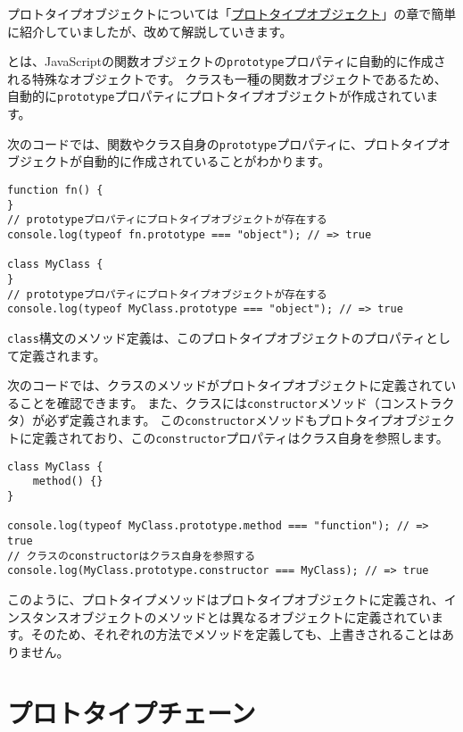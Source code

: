 プロトタイプオブジェクトについては「\hyperlink{prototype-object}{プロトタイプオブジェクト}」の章で簡単に紹介していましたが、改めて解説していきます。

\textbf{}とは、JavaScriptの関数オブジェクトの\texttt{prototype}プロパティに自動的に作成される特殊なオブジェクトです。
クラスも一種の関数オブジェクトであるため、自動的に\texttt{prototype}プロパティにプロトタイプオブジェクトが作成されています。

次のコードでは、関数やクラス自身の\texttt{prototype}プロパティに、プロトタイプオブジェクトが自動的に作成されていることがわかります。

\begin{lstlisting}
function fn() {
}
// prototypeプロパティにプロトタイプオブジェクトが存在する
console.log(typeof fn.prototype === "object"); // => true

class MyClass {
}
// prototypeプロパティにプロトタイプオブジェクトが存在する
console.log(typeof MyClass.prototype === "object"); // => true
\end{lstlisting}

\texttt{class}構文のメソッド定義は、このプロトタイプオブジェクトのプロパティとして定義されます。

次のコードでは、クラスのメソッドがプロトタイプオブジェクトに定義されていることを確認できます。
また、クラスには\texttt{constructor}メソッド（コンストラクタ）が必ず定義されます。
この\texttt{constructor}メソッドもプロトタイプオブジェクトに定義されており、この\texttt{constructor}プロパティはクラス自身を参照します。

\begin{lstlisting}
class MyClass {
    method() {}
}

console.log(typeof MyClass.prototype.method === "function"); // => true
// クラスのconstructorはクラス自身を参照する
console.log(MyClass.prototype.constructor === MyClass); // => true
\end{lstlisting}

このように、プロトタイプメソッドはプロトタイプオブジェクトに定義され、インスタンスオブジェクトのメソッドとは異なるオブジェクトに定義されています。そのため、それぞれの方法でメソッドを定義しても、上書きされることはありません。

\hypertarget{prototype-chain}{%
\section{プロトタイプチェーン}\label{prototype-chain}}

